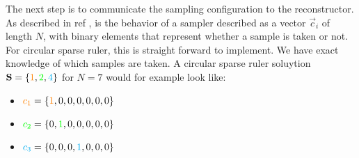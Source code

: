 \documentclass[a4paper, openany, oneside]{memoir}
\begin{document}
The next step is to communicate the sampling configuration to the reconstructor. As described in ref , is the behavior of a sampler described as a vector $\vec{c}_i$ of length $N$, with binary elements that represent whether a sample is taken or not. For circular sparse ruler, this is straight forward to implement. We have exact knowledge of which samples are taken. A circular sparse ruler soluytion $\vec{S}= \{\color{orange}1\color{black},\color{green}2\color{black},\color{cyan}4\color{black}\}$ for $N=7$ would for example look like:
\begin{itemize}
\item $\color{orange}c_1 \color{black}= \{\color{orange}1\color{black},0,0,0,0,0,0\}$
\item $\color{green}c_2 \color{black}= \{0,\color{green}1\color{black},0,0,0,0,0\}$
\item $\color{cyan}c_3 \color{black}= \{0,0,0,\color{cyan}1\color{black},0,0,0\}$
\end{itemize}
\end{document}
